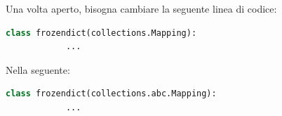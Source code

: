 \documentclass[12pt, letterpaper]{article}
\begin{document}
\begin{appendices}
      \noindent Una volta aperto, bisogna cambiare la seguente linea di codice: \\

      \begin{lstlisting}[language=Python]
      class frozendict(collections.Mapping):
            ...
\end{lstlisting}

      \noindent Nella seguente:

      \begin{lstlisting}[language=Python]
      class frozendict(collections.abc.Mapping):
            ...
\end{lstlisting}

\end{appendices}
\end{document}

